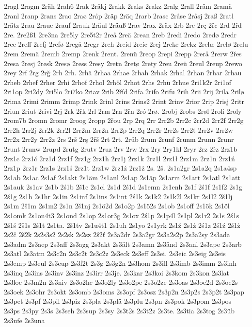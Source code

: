 2ragl
2ragm
2räh
2rah6
2rak
2råkj
2rakk
2raks
2rakz
2ralg
2rall
2räm
2ramä
2ranl
2ranp
2rans
2rao
2raø
2råp
2räp
2räq
2rarb
2rasc
2råse
2råsj
2raß
2ratl
2rätz
2rau
2raue
2rauf
2rauk
2räul
2räuß
2rav
2rax
2räx
2rb
2rc
2rç
2řc
2rd
2řd
2re.
2re2ß1
2re3na
2re5ly
2re5t2r
2reå
2reä
2rean
2reb
2redi
2redo
2redø
2redr
2ree
2reff
2refj
2refø
2regå
2regr
2reh
2reid
2reie
2rej
2reke
2rekz
2relæ
2relø
2relu
2rem
2remä
2remb
2remp
2renk
2rent.
2renü
2reop
2repi
2repp
2rerå
2rerw
2řes
2resa
2resj
2resk
2resø
2ress
2resy
2retn
2retø
2rety
2reu
2reü
2reul
2reup
2rewo
2rey
2rf
2rg
2rğ
2rh
2rh.
2rhä
2rhaa
2rhae
2rhah
2rhak
2rhal
2rhan
2rhar
2rhau
2rheb
2rhef
2rher
2rhi
2rhof
2rhol
2rhöl
2rhot
2rhs
2rhü
2rhue
2ri1k2r
2ri1of
2ri1op
2ri2dy
2ri5lo
2ri7ko
2riav
2rib
2říd
2rifa
2rifo
2rifu
2rih
2rii
2rij
2rila
2rilø
2rima
2rimi
2rimm
2rimp
2rink
2rinl
2rins
2rins2
2rint
2rinv
2rior
2rip
2risj
2ritr
2riun
2riut
2rivi
2rj
2rk
2řk
2rl
2rm
2rn
2řn
2ró
2rø.
2robj
2robs
2røl
2roli
2roly
2rom7b
2romn
2romr
2roog
2ropp
2řou
2rp
2rq
2rr
2rr2b
2rr2c
2rr2d
2rr2f
2rr2g
2rr2h
2rr2j
2rr2k
2rr2l
2rr2m
2rr2n
2rr2p
2rr2q
2rr2r
2rr2s
2rr2t
2rr2v
2rr2w
2rr2x
2rr2y
2rr2z
2rs
2rš
2rş
2řš
2rt
2rt.
2rüb
2rum
2runf
2runm
2runn
2runr
2runt
2runw
2rupd
2rutg
2rutv
2ruz
2rv
2rw
2rx
2ry
2ry1kl
2ryr
2rz
2řz
2rz1b
2rz1c
2rz1ć
2rz1d
2rz1f
2rz1g
2rz1h
2rz1j
2rz1k
2rz1l
2rz1ł
2rz1m
2rz1n
2rz1ń
2rz1p
2rz1r
2rz1s
2rz1ś
2rz1t
2rz1w
2rz1ź
2rz1ż
2s.
2š.
2s1a2gr
2s1a2q
2s1a4sp
2s1ab
2s1ac
2s1af
2s1akt
2s1äm
2s1anl
2s1ap
2s1äp
2s1arm
2s1art
2s1atl
2s1att
2s1auk
2s1av
2s1b
2ś1b
2š1c
2s1cl
2s1d
2ś1d
2s1emn
2s1enh
2s1f
2ś1f
2s1f2
2s1g
2ś1g
2s1h
2s1hr
2s1in
2s1inf
2s1ins
2s1int
2ś1k
2s1k2
2s1k2l
2s1kr
2s1l2
2š1lj
2s1m
2š1m
2s1m2
2s1n
2š1nj
2s1ö2d
2s1o2p
2s1ö2s
2s1ob
2s1off
2s1ök
2s1öl
2s1omk
2s1on4t3
2s1ond
2s1op
2s1or3g
2s1ox
2ś1p
2s1p4l
2s1pl
2s1r2
2s1s
2ś1s
2ś1ś
2š1s
2ś1t
2s1ta.
2š1tv
2s1u4t1
2s1uh
2s1yo
2s1yrk
2s1ź
2s1ż
2ś1z
2ś1ź
2ś1ż
2s2č
2š2k
2s2s3s2
2s2sk
2s2sz
2š2ť
2s3a2dr
2s3a2gr
2s3a2s2p
2s3a2sy
2s3ada
2s3adm
2s3aep
2s3aff
2s3agg
2s3akt
2s3ält
2s3amn
2s3änd
2s3anl
2s3ape
2s3arb
2s3atl
2s3atm
2s3c2n
2s3c2t
2s3c2z
2s3eck
2s3eff
2s3ei.
2s3eic
2s3eig
2s3eis
2s3emp
2s3eul
2s3eup
2s3f2t
2s3g
2s3g2n
2s3hom
2s3ill
2s3imb
2s3imm
2s3inh
2s3inq
2s3ins
2s3inv
2s3inz
2s3irr
2s3je.
2s3kar
2s3koi
2s3kom
2s3kon
2s3lat
2s3loc
2s3m2n
2s3niv
2s3o2he
2s3o2ly
2s3o2pe
2s3o2ze
2s3oas
2s3oe2d
2s3oe2s
2s3oek
2s3ohr
2s3okt
2s3omb
2s3oms
2s3opf
2s3osz
2s3p2n
2s3p2s
2s3p2t
2s3pap
2s3pet
2s3pf
2s3pil
2s3piz
2s3pla
2s3plä
2s3plu
2s3pn
2s3pok
2s3pom
2s3pos
2s3ps
2s3py
2s3s
2s3seh
2s3sup
2s3sy
2s3t2s
2s3t2z
2s3te.
2s3tia
2s3tog
2s3üb
2s3ufe
2s3una
